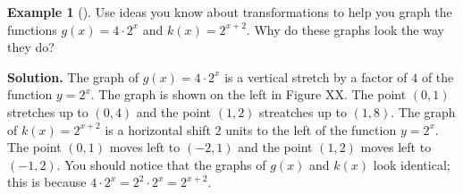 \documentclass[10pt,]{book}
\theoremstyle{plain}
\theoremstyle{definition}
\theoremstyle{definition}
\newtheorem{example}[theorem]{Example}
\theoremstyle{definition}
\numberwithin{equation}{section}
\newlength{\panelmax}
\begin{document}
\begin{example}[]\label{example-15}
\hypertarget{p-237}{}%
Use ideas you know about transformations to help you graph the functions  \(g(x) = 4 \cdot 2^x\) and \(k(x)=2^{x+2}\). Why do these graphs look the way they do?%
\par\smallskip%
\noindent\textbf{Solution.}\hypertarget{solution-15}{}\quad%
\hypertarget{p-238}{}%
The graph of \(g(x) = 4 \cdot 2^x\) is a vertical stretch by a factor of \(4\) of the function \(y=2^x\). The graph is shown on the left in Figure XX. The point \((0,1)\) stretches up to \((0,4)\) and the point \((1,2)\) streatches up to \((1,8)\). The graph of \(k(x)=2^{x+2}\) is a horizontal shift \(2\) units to the left of the function \(y=2^x\). The point \((0,1)\) moves left to \((-2,1)\)  and the point \((1,2)\)  moves left to \((-1,2)\). You should notice that the graphs of \(g(x)\) and \(k(x)\) look identical; this is because \(4 \cdot 2^x = 2^2 \cdot 2^x = 2^{x+2}\). \begin{figure}
\centering
{%
\setlength{\panelmax}{0pt}
\ifdefined\panelboxAimage\else\newsavebox{\panelboxAimage}\fi%
\begin{lrbox}{\panelboxAimage}
\end{lrbox}}
\end{figure}
\end{example}
\end{document}

